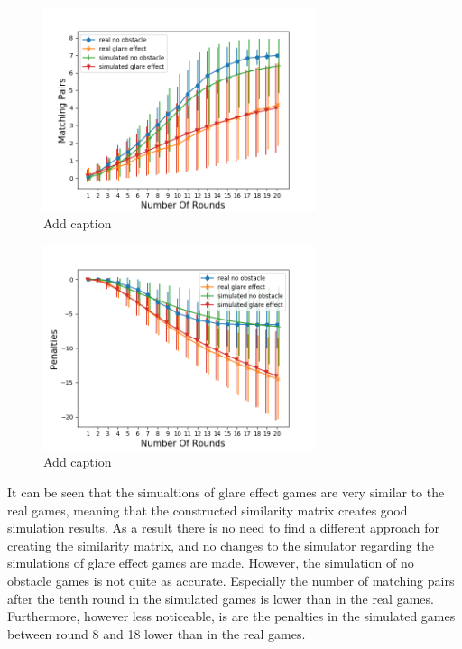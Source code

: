 \begin{minipage}{0.5\textwidth}
	\begin{figure}[H]
		\centering
		\includegraphics[width=8cm]{images/simulationInitial1.png}
		\caption[Bild kurz]{Add caption}
		\label{fig:simIn1}
	\end{figure}
\end{minipage}
\begin{minipage}{0.5\textwidth}
	\begin{figure}[H]
		\centering
		\includegraphics[width=8cm]{images/simulationInitial2.png}
		\caption[Bild kurz]{Add caption}
		\label{fig:simIn2}
	\end{figure}
\end{minipage}

It can be seen that the simualtions of glare effect games are very similar to the real games, meaning that the constructed similarity matrix creates good simulation results. As a result there is no need to find a different approach for creating the similarity matrix, and no changes to the simulator regarding the simulations of glare effect games are made. However, the simulation of no obstacle games is not quite as accurate. Especially the number of matching pairs after the tenth round in the simulated games is lower than in the real games. Furthermore, however less noticeable, is are the penalties in the simulated games between round 8 and 18 lower than in the real games.

